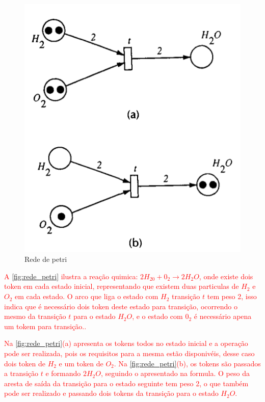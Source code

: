 \begin{figure}[H]
	\begin{center}
    \caption{\label{fig:rede_petri}Rede de petri}
	\includegraphics[scale=0.60]{Figuras/rede_petri.png}
	\end{center}
\end{figure}

\par
\textcolor{red}{A \autoref{fig:rede_petri} ilustra a reação quimica: $2H_20 + 0_2 \rightarrow 2H_2O$, onde existe dois token em cada estado inicial, representando que existem duas particulas de $H_2$ e $O_2$ em cada estado. O arco que liga o estado com $H_2$  transição $t$ tem peso 2, isso indica que é necessário dois token deste estado para transição, ocorrendo o mesmo da transição $t$ para o estado $H_2O$, e o estado com $0_2$ é necessário apena um tokem para transição.\cite{murata1989petri}.}

\par
\textcolor{red}{Na \autoref{fig:rede_petri}(a) apresenta os tokens todos no estado inicial e a operação pode ser realizada, pois os requisitos para a mesma estão disponivéis, desse caso dois token de $H_2$ e um token de $O_2$. Na \autoref{fig:rede_petri}(b), os tokens são passados a transição $t$ e formando $2H_2O$, seguindo o apresentado na formula. O peso da aresta de saída da transição para o estado seguinte tem peso 2, o que também pode ser realizado e passando dois tokens da transição para o estado $H_2O$\cite{murata1989petri}.} 

